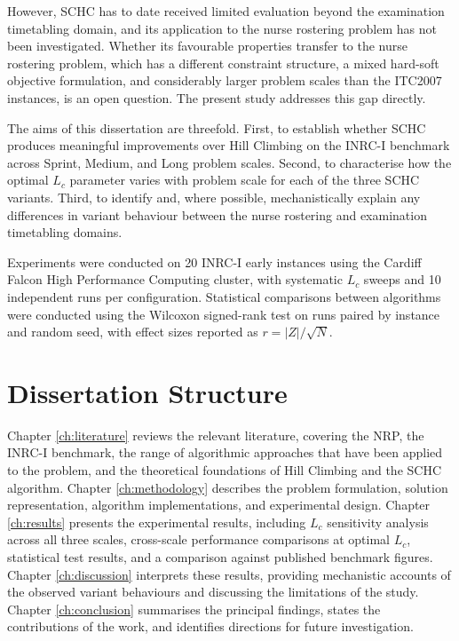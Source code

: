 \documentclass[12pt, a4paper, oneside]{report}
\begin{document}
However, SCHC has to date received limited evaluation beyond the examination timetabling domain, and its application to the nurse rostering problem has not been investigated. Whether its favourable properties
transfer to the nurse rostering problem, which has a different
constraint structure, a mixed hard-soft objective formulation, and
considerably larger problem scales than the ITC2007 instances, is
an open question. The present study addresses this gap directly.

The aims of this dissertation are threefold. First, to establish
whether SCHC produces meaningful improvements over Hill Climbing on
the INRC-I benchmark across Sprint, Medium, and
Long problem scales. Second, to characterise how the
optimal $L_c$ parameter varies with problem scale for each of the
three SCHC variants. Third, to identify and, where possible,
mechanistically explain any differences in variant behaviour between
the nurse rostering and examination timetabling domains.

Experiments were conducted on 20 INRC-I early instances using the
Cardiff Falcon High Performance Computing cluster, with systematic
$L_c$ sweeps and 10 independent runs per configuration. Statistical
comparisons between algorithms were conducted using the Wilcoxon
signed-rank test on runs paired by instance and random seed, with
effect sizes reported as $r = |Z|/\sqrt{N}$.

\section{Dissertation Structure}
\label{sec:structure}

Chapter \ref{ch:literature} reviews the relevant literature,
covering the NRP, the INRC-I benchmark, the range of algorithmic
approaches that have been applied to the problem, and the
theoretical foundations of Hill Climbing and the SCHC algorithm.
Chapter \ref{ch:methodology} describes the problem formulation,
solution representation, algorithm implementations, and experimental
design. Chapter \ref{ch:results} presents the experimental results,
including $L_c$ sensitivity analysis across all three scales,
cross-scale performance comparisons at optimal $L_c$, statistical
test results, and a comparison against published benchmark figures.
Chapter \ref{ch:discussion} interprets these results, providing
mechanistic accounts of the observed variant behaviours and
discussing the limitations of the study. Chapter
\ref{ch:conclusion} summarises the principal findings, states the
contributions of the work, and identifies directions for future
investigation.
\end{document}
